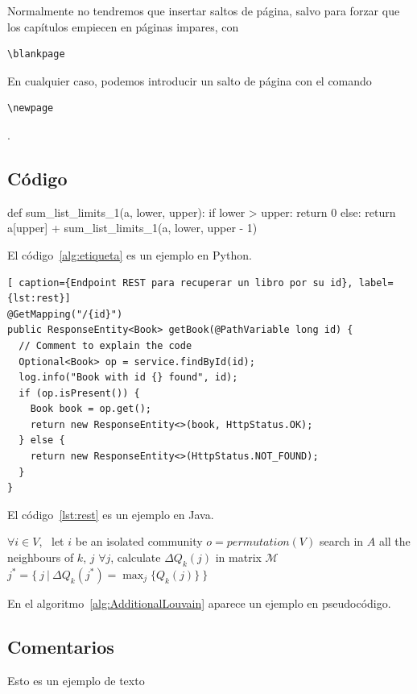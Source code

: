 Normalmente no tendremos que insertar saltos de página, salvo para forzar que los capítulos empiecen en páginas impares, con \begin{verbatim}\blankpage\end{verbatim} En cualquier caso, podemos introducir un salto de página con el comando \begin{verbatim}\newpage\end{verbatim}.

\newpage



\subsection{Código}


\begin{mypython}[caption={Titulo del algoritmo/código.},label={alg:etiqueta}]
def sum_list_limits_1(a, lower, upper):
    if lower > upper:
        return 0
    else:
        return a[upper] + sum_list_limits_1(a, lower, upper - 1)
\end{mypython}
El código~\ref{alg:etiqueta} es un ejemplo en Python.


\begin{lstlisting}[ caption={Endpoint REST para recuperar un libro por su id}, label={lst:rest}]
@GetMapping("/{id}")
public ResponseEntity<Book> getBook(@PathVariable long id) {
  // Comment to explain the code
  Optional<Book> op = service.findById(id);
  log.info("Book with id {} found", id);
  if (op.isPresent()) {
    Book book = op.get();
    return new ResponseEntity<>(book, HttpStatus.OK);
  } else {
    return new ResponseEntity<>(HttpStatus.NOT_FOUND);
  }
}
\end{lstlisting}
El código~\ref{lst:rest} es un ejemplo en Java.

\begin{algorithm}
\begin{algorithmic}[1]
\STATE $\forall i \in V$, \ let $i$ be an isolated community
\STATE $o=permutation(V)$
\STATE search in $A$ all the neighbours of $k$, $j$
\STATE $\forall j$, calculate $\Delta Q_k(j)$ in matrix $\mathcal{M}$
\STATE $j^*=\{ \ j \ | \ \Delta Q_k(j^*)=\max_j\{Q_k(j)\} \ \}$
\ELSE
{}
\ENDIF
\ENDFOR
\end{algorithmic}\caption{\textit{Additional Louvain} \textbf{input}=$\left(A, \ \mathcal{M}\right)$ \textbf{output}=$P$}
\label{alg:AdditionalLouvain}
\end{algorithm}
En el algoritmo~\ref{alg:AdditionalLouvain} aparece un ejemplo en pseudocódigo.

\subsection{Comentarios}

Esto es un ejemplo de texto  
